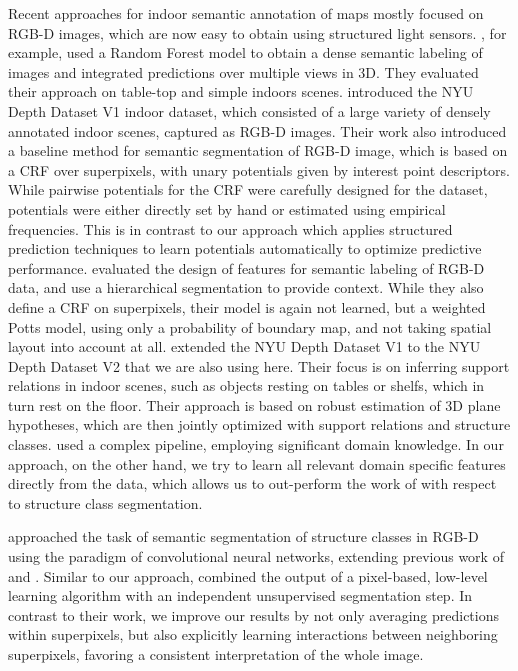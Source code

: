 Recent approaches for indoor semantic annotation of maps mostly focused on
\mbox{RGB-D} images, which are now easy to obtain using structured light sensors.
\citet{stuckler2012semantic}, for example, used a Random Forest model to obtain a dense
semantic labeling of images and integrated predictions over multiple views in 3D.
They evaluated their approach on table-top and simple indoors scenes.
%
\citet{silberman2011indoor} introduced the NYU Depth Dataset V1 indoor dataset,
which consisted of a large variety of densely annotated indoor scenes, captured as \mbox{RGB-D} images.
Their work also introduced a baseline method for semantic segmentation of \mbox{RGB-D}
image, which is based on a CRF over superpixels, with unary potentials given by interest point descriptors.
While pairwise potentials for the CRF were carefully
designed for the dataset, potentials were either directly set by hand or estimated using empirical
frequencies. This is in contrast to our approach which applies structured prediction techniques
to learn potentials automatically to optimize predictive performance.
%
\citet{ren2012rgb} evaluated the design of features for semantic labeling of
\mbox{RGB-D} data, and use a hierarchical segmentation to provide context. While they
also define a CRF on superpixels, their model is again not learned, but a
weighted Potts model, using only a probability of boundary map, and not taking
spatial layout into account at all.
%
\citet{SilbermanECCV12} extended the NYU Depth Dataset V1 to the NYU Depth Dataset V2 that we are also
using here.  Their focus is on inferring support relations in indoor
scenes, such as objects resting on tables or shelfs, which in turn rest on the floor.
Their approach is based on robust estimation of 3D plane hypotheses, which are then jointly
optimized with support relations and structure classes.
\citet{SilbermanECCV12} used a complex pipeline, employing significant domain knowledge.
In our approach, on the other hand, we try to learn all relevant domain specific features
directly from the data, which allows us to out-perform the work of \citet{SilbermanECCV12}
with respect to structure class segmentation.

\citet{couprie-iclr-13} approached the task of semantic segmentation of structure classes
in \mbox{RGB-D} using the paradigm of convolutional neural networks, extending
previous work of \citet{farabet-pami-13} and \citet{schulz2012learning}.
Similar to our approach, \citet{couprie-iclr-13} combined the output of a
pixel-based, low-level learning algorithm with an independent unsupervised
segmentation step. In contrast to their work, we improve our results by not
only averaging predictions within superpixels, but also explicitly learning
interactions between neighboring superpixels, favoring a consistent
interpretation of the whole image.

